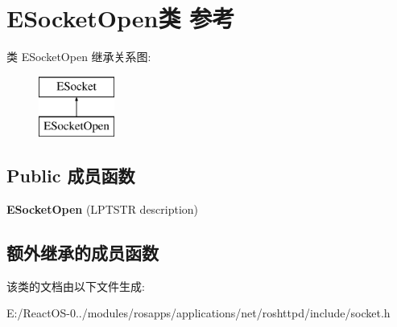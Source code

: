 \hypertarget{class_e_socket_open}{}\section{E\+Socket\+Open类 参考}
\label{class_e_socket_open}
类 E\+Socket\+Open 继承关系图\+:\begin{figure}[H]
\begin{center}
\leavevmode
\includegraphics[height=2.000000cm]{class_e_socket_open}
\end{center}
\end{figure}
\subsection*{Public 成员函数}
\begin{DoxyCompactItemize}
\item 
\mbox{\label{class_e_socket_open_a7a708b537c7dddb4099ab99e77a7f7fc}} 
{\bfseries E\+Socket\+Open} (L\+P\+T\+S\+TR description)
\end{DoxyCompactItemize}
\subsection*{额外继承的成员函数}


该类的文档由以下文件生成\+:\begin{DoxyCompactItemize}
\item 
E\+:/\+React\+O\+S-\/0../modules/rosapps/applications/net/roshttpd/include/socket.\+h\end{DoxyCompactItemize}
